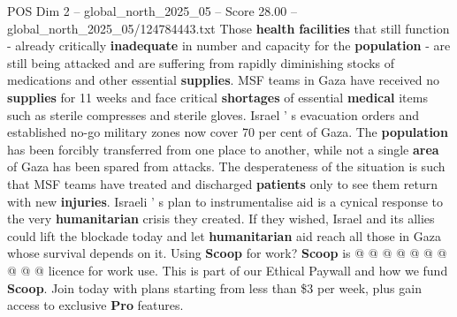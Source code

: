 \begin{textsample}{POS Dim 2 – global\_north\_2025\_05 – Score 28.00 – global\_north\_2025\_05/124784443.txt}
Those \textbf{health} \textbf{facilities} that still function - already critically \textbf{inadequate} in number and capacity for the \textbf{population} - are still being attacked and are suffering from rapidly diminishing stocks of medications and other essential \textbf{supplies}.
MSF teams in Gaza have received no \textbf{supplies} for 11 weeks and face critical \textbf{shortages} of essential \textbf{medical} items such as sterile compresses and sterile gloves.
Israel ' s evacuation orders and established no-go military zones now cover 70 per cent of Gaza.
The \textbf{population} has been forcibly transferred from one place to another, while not a single \textbf{area} of Gaza has been spared from attacks.
The desperateness of the situation is such that MSF teams have treated and discharged \textbf{patients} only to see them return with new \textbf{injuries}.
Israeli ' s plan to instrumentalise aid is a cynical response to the very \textbf{humanitarian} crisis they created.
If they wished, Israel and its allies could lift the blockade today and let \textbf{humanitarian} aid reach all those in Gaza whose survival depends on it.
Using \textbf{Scoop} for work? \textbf{Scoop} is @ @ @ @ @ @ @ @ @ @ licence for work use.
This is part of our Ethical Paywall and how we fund \textbf{Scoop}.
Join today with plans starting from less than \$3 per week, plus gain access to exclusive \textbf{Pro} features.

\end{textsample}
